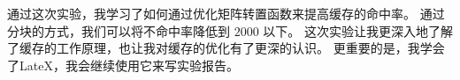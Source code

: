 通过这次实验，我学习了如何通过优化矩阵转置函数来提高缓存的命中率。
通过分块的方式，我们可以将不命中率降低到 $2000$ 以下。
这次实验让我更深入地了解了缓存的工作原理，也让我对缓存的优化有了更深的认识。
更重要的是，我学会了LateX，我会继续使用它来写实验报告。
